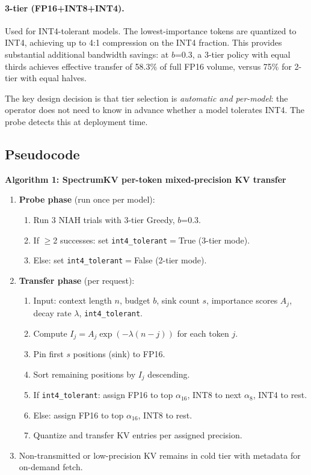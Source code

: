 \documentclass[11pt]{article}
\newcommand{\pct}{\%}
\theoremstyle{definition}
\theoremstyle{plain}
\begin{document}
\paragraph{3-tier (FP16+INT8+INT4).} Used for INT4-tolerant models.  The lowest-importance tokens are quantized to INT4, achieving up to 4:1 compression on the INT4 fraction.  This provides substantial additional bandwidth savings: at $b$=0.3, a 3-tier policy with equal thirds achieves effective transfer of 58.3\pct{} of full FP16 volume, versus 75\pct{} for 2-tier with equal halves.

The key design decision is that tier selection is \emph{automatic and per-model}: the operator does not need to know in advance whether a model tolerates INT4.  The probe detects this at deployment time.

\subsection{Pseudocode}
\begin{center}
\begin{minipage}{0.94\linewidth}
\small
\textbf{Algorithm 1: SpectrumKV per-token mixed-precision KV transfer}
\begin{enumerate}[leftmargin=1.8em,itemsep=2pt]
  \item \textbf{Probe phase} (run once per model):
    \begin{enumerate}[leftmargin=1.5em,itemsep=1pt]
      \item Run 3 NIAH trials with 3-tier Greedy, $b$=0.3.
      \item If $\ge$2 successes: set \texttt{int4\_tolerant}$=$True (3-tier mode).
      \item Else: set \texttt{int4\_tolerant}$=$False (2-tier mode).
    \end{enumerate}
  \item \textbf{Transfer phase} (per request):
    \begin{enumerate}[leftmargin=1.5em,itemsep=1pt]
      \item Input: context length $n$, budget $b$, sink count $s$, importance scores $A_j$, decay rate $\lambda$, \texttt{int4\_tolerant}.
      \item Compute $I_j = A_j \exp(-\lambda(n-j))$ for each token $j$.
      \item Pin first $s$ positions (sink) to FP16.
      \item Sort remaining positions by $I_j$ descending.
      \item If \texttt{int4\_tolerant}: assign FP16 to top $\alpha_{16}$, INT8 to next $\alpha_8$, INT4 to rest.
      \item Else: assign FP16 to top $\alpha_{16}$, INT8 to rest.
      \item Quantize and transfer KV entries per assigned precision.
    \end{enumerate}
  \item Non-transmitted or low-precision KV remains in cold tier with metadata for on-demand fetch.
\end{enumerate}
\end{minipage}
\end{center}
\end{document}
